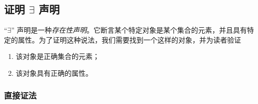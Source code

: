 \subsection{证明 $\exists$ 声明}\label{sec:section4.9.1}

``$\exists$'' 声明是一种\emph{存在性声明}。它断言某个特定对象是某个集合的元素，并且具有特定的属性。为了证明这种说法，我们需要找到一个这样的对象，并为读者验证
\begin{enumerate}[label=(\arabic*)]
    \item 该对象是正确集合的元素；
    \item 该对象具有正确的属性。
\end{enumerate}

\subsubsection*{直接证法}

\setlength{\fboxrule}{2pt}
\setlength\fboxsep{5mm}
\begin{center}
\noindent {}
\end{center}

\newpage

